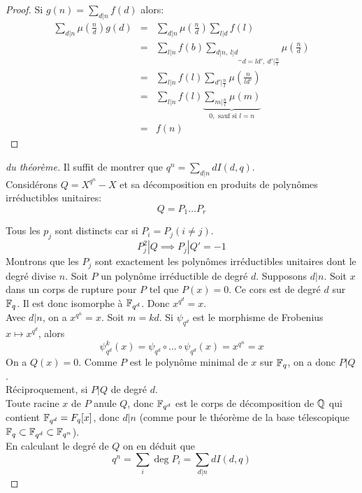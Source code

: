 \begin{proof}
	Si $g(n) = \sum_{d|n} f(d)$ alors:
	\begin{eqnarray*}
		\sum_{d|n} \mu(\frac n d) g(d) &=& \sum_{d|n} \mu(\frac n d) \sum_{l|d} f(l) \\
		&=& \sum_{l|n} f(b) \underbrace{\sum_{d|n,\ l|d}}_{ d = ld', \ d' | \frac n l} \mu(\frac n d) \\
		&=& \sum_{l | n} f(l) \sum_{d' | \frac n l} \mu(\frac n {ld'}) \\
		&=& \sum_{l | n} f(l) \underbrace{\sum_{m | \frac n l} \mu(m)}_{ 0, \text{ sauf si } l = n } \\
		&=& f(n)
	\end{eqnarray*}
\end{proof}

\begin{proof}[du théorème]
	Il suffit de montrer que $q^n = \sum_{d|n} d I(d,q)$.\\

	Considérons $Q = X^{q^n} - X$ et sa décomposition en produits de polynômes irréductibles unitaires:
	$$ Q = P_1 \ldots P_r$$

	Tous les $p_j$ sont distincts car si $P_i = P_j (i \neq j)$.\\
	$$P_j^2 | Q \implies P_j | Q' = - 1$$
	Montrons que les $P_j$ sont exactement les polynômes irréductibles unitaires dont le degré divise $n$. Soit $P$ un
	polynôme irréductible de degré $d$. Supposons $d | n$. Soit $x$ dans un corps de rupture pour $P$ tel que $P(x) = 0$.
	Ce cors est de degré $d$ sur $\mathbb{F}_q$. Il est donc isomorphe à $\mathbb{F}_{q^d}$. Donc $x^{q^d} = x$.\\
	Avec $d|n$, on a $x^{q^n} = x$. Soit $m = kd$. Si $\psi_{q^d}$ est le morphisme de Frobenius $x \mapsto x^{q^d}$, alors
	$$\psi_{q^d}^k(x) = \psi_{q^d} \circ \dots \circ \psi_{q^d}(x) = x^{q^n} = x$$
	On a $Q(x) = 0$. Comme $P$ est le polynôme minimal de $x$ sur $\mathbb{F}_q$, on a donc $P | Q$.\\

	Réciproquement, si $P | Q$ de degré $d$.\\
	Toute racine $x$ de $P$ anule $Q$, donc $\mathbb{F}_{q^d}$ est le corps de décomposition de $\mathbb{Q}$ qui contient $\mathbb{F}_{q^d} = F_q[x]$, donc
	$d | n$ (comme pour le théorème de la base télescopique $\mathbb{F}_q \subset \mathbb{F}_{q^d} \subset \mathbb{F}_{q^n}$).\\

	En calculant le degré de $Q$ on en déduit que
	$$q^n = \sum_i \deg P_i = \sum_{d|n} d I(d,q)$$
\end{proof}


